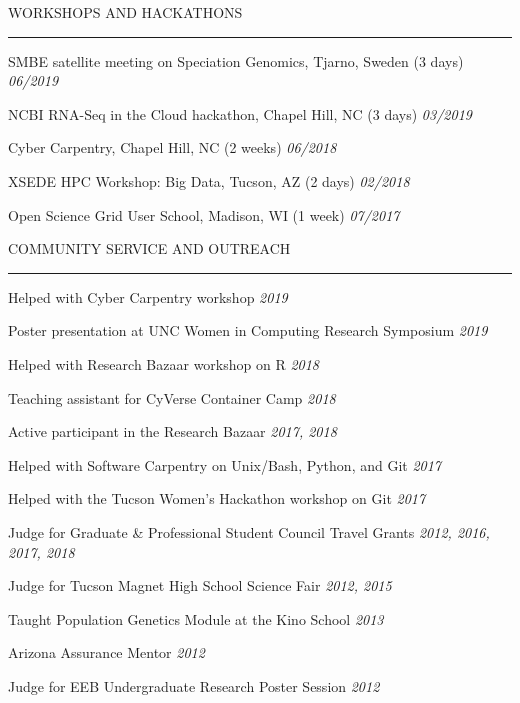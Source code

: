 \documentclass{resume} %
\renewenvironment{rSection}[1]{
\sectionskip
\textcolor{RoyalPurple}{\MakeUppercase{#1}}
\sectionlineskip
\hrule
\begin{list}{}{
\setlength{\leftmargin}{1.5em}
}
\item[]
}{
\end{list}
}
\begin{document}
\begin{rSection}{Workshops and Hackathons}

\item SMBE satellite meeting on Speciation Genomics, Tjarno, Sweden (3 days) \hfill{\em 06/2019}
\item NCBI RNA-Seq in the Cloud hackathon, Chapel Hill, NC (3 days) \hfill {\em 03/2019}
\item Cyber Carpentry, Chapel Hill, NC (2 weeks) \hfill {\em 06/2018}
\item XSEDE HPC Workshop: Big Data, Tucson, AZ (2 days) \hfill {\em 02/2018}
\item Open Science Grid User School, Madison, WI (1 week) \hfill {\em 07/2017}

\end{rSection}


\begin{rSection}{Community Service and Outreach}

\item Helped with Cyber Carpentry workshop \hfill {\em 2019}
\item Poster presentation at UNC Women in Computing Research Symposium \hfill {\em 2019}
\item Helped with Research Bazaar workshop on R \hfill {\em 2018}
\item Teaching assistant for CyVerse Container Camp \hfill {\em 2018}
\item Active participant in the Research Bazaar \hfill {\em 2017, 2018}
\item Helped with Software Carpentry on Unix/Bash, Python, and Git \hfill {\em 2017}
\item Helped with the Tucson Women’s Hackathon workshop on Git \hfill {\em 2017}
\item Judge for Graduate \& Professional Student Council Travel Grants \hfill {\em 2012, 2016, 2017, 2018}
\item Judge for Tucson Magnet High School Science Fair \hfill {\em 2012, 2015}
\item Taught Population Genetics Module at the Kino School \hfill {\em 2013}
\item Arizona Assurance Mentor \hfill {\em 2012}
\item Judge for EEB Undergraduate Research Poster Session \hfill {\em 2012}

\end{rSection}
\end{document}
